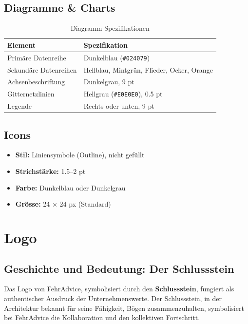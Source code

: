 \subsection{Diagramme \& Charts}

\begin{table}[h]
\centering
\caption{Diagramm-Spezifikationen}
\label{tab:chart-specs}
\begin{tabular}{ll}
\toprule
\textbf{Element} & \textbf{Spezifikation} \\
\midrule
Primäre Datenreihe & Dunkelblau (\texttt{\#024079}) \\
Sekundäre Datenreihen & Hellblau, Mintgrün, Flieder, Ocker, Orange \\
Achsenbeschriftung & Dunkelgrau, 9 pt \\
Gitternetzlinien & Hellgrau (\texttt{\#E0E0E0}), 0.5 pt \\
Legende & Rechts oder unten, 9 pt \\
\bottomrule
\end{tabular}
\end{table}

\subsection{Icons}

\begin{itemize}
    \item \textbf{Stil:} Liniensymbole (Outline), nicht gefüllt
    \item \textbf{Strichstärke:} 1.5–2 pt
    \item \textbf{Farbe:} Dunkelblau oder Dunkelgrau
    \item \textbf{Grösse:} 24 $\times$ 24 px (Standard)
\end{itemize}


\section{Logo}
\label{sec:sg-logo}

\subsection{Geschichte und Bedeutung: Der Schlussstein}

Das Logo von FehrAdvice, symbolisiert durch den \textbf{Schlussstein}, fungiert
als authentischer Ausdruck der Unternehmenswerte. Der Schlussstein, in der
Architektur bekannt für seine Fähigkeit, Bögen zusammenzuhalten, symbolisiert
bei FehrAdvice die Kollaboration und den kollektiven Fortschritt.

